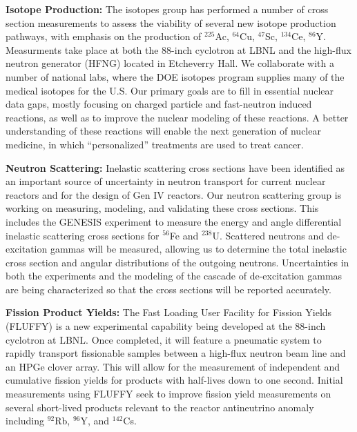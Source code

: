 \vspace{-0.5cm}


\vspace{-1.5cm}

\textbf{Isotope Production:}
The isotopes group has performed a number of cross section measurements to assess the viability of several new isotope production pathways, with emphasis on the production of $^{225}$Ac, $^{64}$Cu, $^{47}$Sc, $^{134}$Ce, $^{86}$Y.  
Measurments take place at both the 88-inch cyclotron at LBNL and the high-flux neutron generator (HFNG) located in Etcheverry Hall.  
We collaborate with a number of national labs, where the DOE isotopes program supplies many of the medical isotopes for the U.S.  
Our primary goals are to fill in essential nuclear data gaps, mostly focusing on charged particle and fast-neutron induced reactions, as well as to improve the nuclear modeling of these reactions.  
A better understanding of these reactions will enable the next generation of nuclear medicine, in which ``personalized'' treatments are used to treat cancer.

\textbf{Neutron Scattering:}
Inelastic scattering cross sections have been identified as an important source of uncertainty in neutron transport for current nuclear reactors and for the design of Gen IV reactors. 
Our neutron scattering group is working on measuring, modeling, and validating these cross sections. 
This includes the GENESIS experiment to measure the energy and angle differential inelastic scattering cross sections for $^{56}$Fe and $^{238}$U. 
Scattered neutrons and de-excitation gammas will be measured, allowing us to determine the total inelastic cross section and angular distributions of the outgoing neutrons. 
Uncertainties in both the experiments and the modeling of the cascade of de-excitation gammas are being characterized so that the cross sections will be reported accurately. 

\textbf{Fission Product Yields:}
The Fast Loading User Facility for Fission Yields (FLUFFY) is a new experimental capability being developed at the 88-inch cyclotron at LBNL.
Once completed, it will feature a pneumatic system to rapidly transport fissionable samples between a high-flux neutron beam line and an HPGe clover array. 
This will allow for the measurement of independent and cumulative fission yields for products with half-lives down to one second. 
Initial measurements using FLUFFY seek to improve fission yield measurements on several short-lived products relevant to the reactor antineutrino anomaly including $^{92}$Rb, $^{96}$Y, and $^{142}$Cs. 

